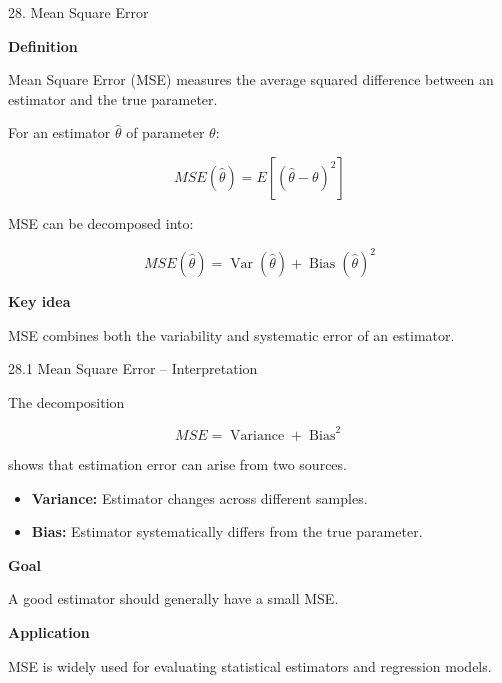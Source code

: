
\begin{frame}{28. Mean Square Error}

\textbf{Definition}

Mean Square Error (MSE) measures the average squared difference
between an estimator and the true parameter.

\vspace{0.4cm}

For an estimator $\hat{\theta}$ of parameter $\theta$:

\[
\boxed{
MSE(\hat{\theta})
=
E[(\hat{\theta}-\theta)^2]
}
\]

\vspace{0.4cm}

MSE can be decomposed into:

\[
\boxed{
MSE(\hat{\theta})
=
\operatorname{Var}(\hat{\theta})
+
\operatorname{Bias}(\hat{\theta})^2
}
\]

\vspace{0.3cm}

\textbf{Key idea}

MSE combines both the variability and systematic error
of an estimator.

\end{frame}



\begin{frame}{28.1 Mean Square Error -- Interpretation}

The decomposition

\[
MSE
=
\operatorname{Variance}
+
\operatorname{Bias}^2
\]

shows that estimation error can arise from two sources.

\vspace{0.4cm}

\begin{itemize}
    \item \textbf{Variance:} Estimator changes across different samples.
    \item \textbf{Bias:} Estimator systematically differs from the true parameter.
\end{itemize}

\vspace{0.4cm}

\textbf{Goal}

A good estimator should generally have a small MSE.

\vspace{0.3cm}

\textbf{Application}

MSE is widely used for evaluating statistical estimators
and regression models.

\end{frame}


